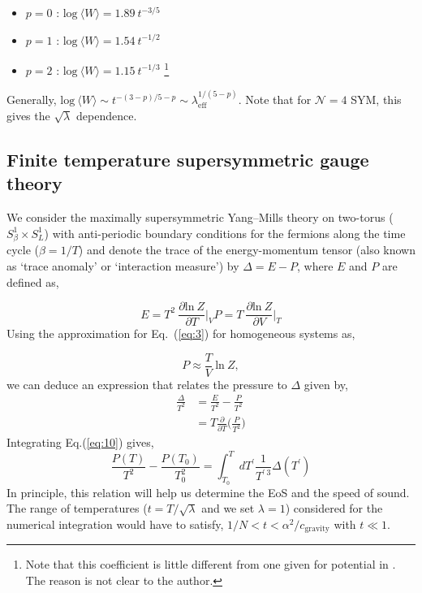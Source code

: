 \begin{itemize} 
\item $p = 0$ : $ \text{log} ~ \langle W \rangle = 1.89~t^{-3/5}$
\item $p = 1$ : $ \text{log} ~ \langle W \rangle = 1.54~t^{-1/2}$
\item $p = 2$ : $ \text{log} ~ \langle W \rangle = 1.15~t^{-1/3}$  \footnote{Note that this coefficient is little different from one given for potential in \cite{Maldacena:1998im}. The
reason is not clear to the author.} 
\end{itemize}  
Generally, $\text{log} ~ \langle W \rangle \sim t^{-(3-p)/5-p}  \sim \lambda_{\mathrm{eff}}^{1/(5-p)}$. Note that
for $\mathcal{N} = 4$ SYM, this gives the $\sqrt{\lambda}$ dependence. 

\subsection{Finite temperature supersymmetric gauge theory} 

We consider the maximally supersymmetric Yang--Mills theory on two-torus ($S^{1}_{\beta} \times S^{1}_{L}$) with anti-periodic 
boundary conditions for the fermions along the time cycle ($\beta = 1/T$) and denote the trace of the energy-momentum
tensor (also known as `trace anomaly' or `interaction measure') by $ \Delta 
= E - P $, where $E$ and $P$ are defined as, 

\begin{equation}
E = T^2 ~ \frac{\partial \text{ln}~ Z}{\partial T}  \bigg\rvert_{V}
P = T ~ \frac{\partial \text{ln}~ Z}{\partial V}  \bigg\rvert_{T}  \label{eq:3}
\end{equation}
Using the approximation for Eq.~(\ref{eq:3}) for homogeneous systems as, 

\begin{equation}
P \approx \frac{T}{V} ~ \text{ln}~ Z ,  
\label{eq:8}
\end{equation}
we can deduce an expression that relates the pressure to $\Delta$ given by, 
\begin{align}
\frac{\Delta}{T^2} &= \frac{E}{T^2} - \frac{P}{T^2} \nonumber  \\  
&= T \frac{\partial}{\partial T} \Big(\frac{P}{T^2}\Big) \label{eq:10}    
\end{align}
Integrating Eq.(\ref{eq:10}) gives, 
\begin{equation}
\frac{P(T)}{T^2} - \frac{P(T_{0})}{T_{0}^2} = \int_{T_{0}}^{T} dT^{\prime} \frac{1}{T^{\prime ~ 3}} \Delta(T^{\prime})
\label{eq:7}
\end{equation}
In principle, this relation will help us determine the EoS and the speed of sound. The range of temperatures ($t = T/\sqrt{\lambda}$ and we set $\lambda = 1$)
considered for the numerical integration would have to satisfy, $ 1/N < t < \alpha^2 / c_{\text{gravity}} $ with $ t \ll 1$. 


